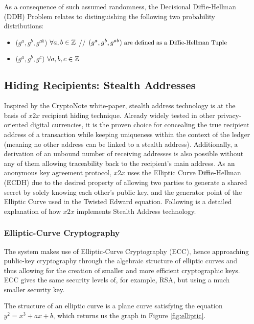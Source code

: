 As a consequence of such assumed randomness, the Decisional Diffie-Hellman (DDH) Problem relates to distinguishing the following two probability distributions:

\begin{itemize}
\item ($g^a, g^b, g^{ab}$) $\forall \space a,b \in \mathbb{Z}\\$ // $\small (g^a, g^b, g^{ab}) \textrm{ are defined as a Diffie-Hellman Tuple}$
\item ($g^a, g^b, g^{c}$) $\forall \space a,b,c \in \mathbb{Z}$
\end{itemize}

\subsection{Hiding Recipients: Stealth Addresses}
Inspired by the CryptoNote white-paper\cite{CryptoNote}, stealth address technology is at the basis of $x2x$ recipient hiding technique. Already widely tested in other privacy-oriented digital currencies, it is the proven choice for concealing the true recipient address of a transaction while keeping uniqueness within the context of the ledger (meaning no other address can be linked to a stealth address). Additionally, a derivation of an unbound number of receiving addresses is also possible without any of them allowing traceability back to the recipient's main address. As an anonymous key agreement protocol, $x2x$ uses the Elliptic Curve Diffie-Hellman (ECDH) due to the desired property of allowing two parties to generate a shared secret by solely knowing each other's public key, and the generator point of the Elliptic Curve used in the Twisted Edward equation. Following is a detailed explanation of how $x2x$ implements Stealth Address technology. 

\subsubsection{Elliptic-Curve Cryptography}

The system makes use of Elliptic-Curve Cryptography (ECC), hence approaching public-key cryptography through the algebraic structure of elliptic curves and thus allowing for the creation of smaller and more efficient cryptographic keys. ECC gives the same security levels of, for example, RSA, but using a much smaller security key.

The structure of an elliptic curve is a plane curve satisfying the equation $y^2=x^3+ax+b$, which returns us the graph in Figure \ref{fig:elliptic}.

